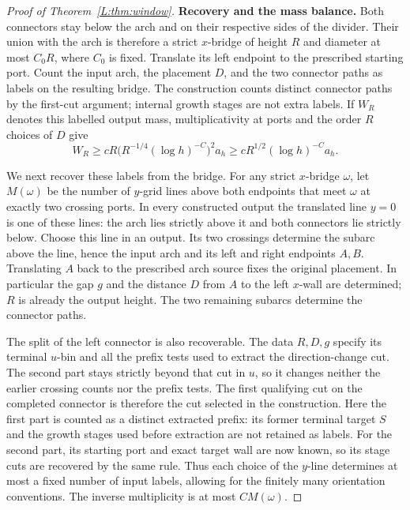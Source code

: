 \documentclass[11pt]{article}
\numberwithin{equation}{section}
\theoremstyle{definition}\newtheorem{definition}[theorem]{Definition}
\theoremstyle{remark}\newtheorem{remark}[theorem]{Remark}
\begin{document}
\begin{proof}[Proof of Theorem~\ref{L:thm:window}]
  \textbf{Recovery and the mass balance.}
Both connectors stay below the arch and on their respective sides of
the divider. Their union with the arch is therefore a strict $x$-bridge
of height $R$ and diameter at most $C_0R$, where $C_0$ is fixed.
Translate its left endpoint to the prescribed starting port. Count the input arch, the placement $D$,
and the two connector paths as labels on the resulting bridge. The
construction counts distinct connector paths by the first-cut argument;
internal growth stages are not extra labels.
If $W_R$ denotes this labelled output mass, multiplicativity at ports
and the order $R$ choices of $D$ give
\begin{equation}
 W_R\ge cR\bigl(R^{-1/4}(\log h)^{-C}\bigr)^2a_h
       \ge cR^{1/2}(\log h)^{-C}a_h.
 \label{L:eq:connector-labelled-mass}
\end{equation}

We next recover these labels from the bridge. For any strict $x$-bridge
$\omega$, let $M(\omega)$ be the number of $y$-grid lines above both
endpoints that meet $\omega$ at exactly two crossing ports. In every
constructed output the translated line $y=0$ is one of these lines:
the arch lies strictly above it and both connectors lie strictly below.
Choose this line in an output. Its two crossings determine the subarc
above the line, hence the input arch and its left and right endpoints
$A,B$. Translating $A$ back to the prescribed arch source fixes the
original placement. In particular the gap $g$ and the distance $D$
from $A$ to the left $x$-wall are determined; $R$ is already the output
height. The two remaining subarcs determine the connector paths.

The split of the left connector is also recoverable. The data $R,D,g$
specify its terminal $u$-bin and all the prefix tests used to extract
the direction-change cut. The second part stays strictly beyond that
cut in $u$, so it changes neither the earlier crossing counts nor the
prefix tests. The first qualifying cut on the completed connector is
therefore the cut selected in the construction. Here the first part
is counted as a distinct extracted prefix: its former terminal target
$S$ and the growth stages used before extraction are not retained as
labels. For the second part, its starting port and exact target wall
are now known, so its stage cuts are recovered by the same rule.
Thus each choice of the $y$-line determines at most a fixed number of
input labels, allowing for the finitely many orientation conventions.
The inverse multiplicity is at most $C M(\omega)$.


\end{proof}
\end{document}
